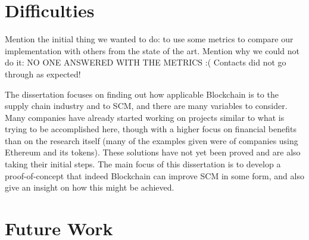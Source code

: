 

\section{Difficulties}
Mention the initial thing we wanted to do: to use some metrics to compare our implementation with others from the state of the art.
Mention why we could not do it: NO ONE ANSWERED WITH THE METRICS :( Contacts did not go through as expected!


The dissertation focuses on finding out how applicable Blockchain is to the supply chain industry and to SCM, and there are many variables to consider. Many companies have already started working on projects similar to what is trying to be accomplished here, though with a higher focus on financial benefits than on the research itself (many of the examples given were of companies using Ethereum and its tokens). These solutions have not yet been proved and are also taking their initial steps. The main focus of this dissertation is to develop a proof-of-concept that indeed Blockchain can improve SCM in some form, and also give an insight on how this might be achieved. 

\section{Future Work}

